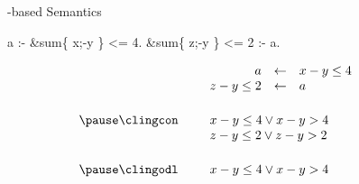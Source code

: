 \begin{frame}[fragile]{\HTC-based Semantics}
  \smallskip
  \begin{semiverbatim}
                           a :- &sum\{ x;-y \} <= 4.
            &sum\{ z;-y \} <= 2 :- a.
  \end{semiverbatim}
  \bigskip\pause
  \[
    \begin{array}{rp{5pt}rclp{20pt}}
                     && a         &\leftarrow&  x-y\leq 4          &\\
                     && z-y\leq2  &\leftarrow&  a                  &\\[15pt]\pause
    \text{\clingcon} && \multicolumn{3}{l}{x-y\leq 4 \lor x-y > 4} &\\
                     && \multicolumn{3}{l}{z-y\leq 2 \lor z-y>2}   &\\[15pt]\pause
    \text{\clingodl} && \multicolumn{3}{l}{x-y\leq 4 \lor x-y > 4} &
    \end{array}
  \]
\end{frame}
%
